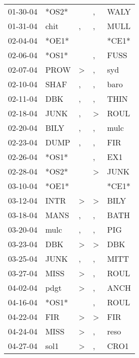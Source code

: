 \begin{supertabular}{lllll}
 01-30-04 &  *OS2* &                  &                , &   WALY \\
 01-31-04 &   chit &                , &                , &   MULL \\
 02-04-04 &  *OE1* &                  &                  &  *CE1* \\
 02-06-04 &  *OS1* &                  &                , &   FUSS \\
 02-07-04 &   PROW &     \textgreater &                , &    syd \\
 02-10-04 &   SHAF &                , &                , &   baro \\
 02-11-04 &    DBK &                , &                , &   THIN \\
 02-18-04 &   JUNK &                , &     \textgreater &   ROUL \\
 02-20-04 &   BILY &                , &                , &   mulc \\
 02-23-04 &   DUMP &                , &                , &    FIR \\
 02-26-04 &  *OS1* &                  &                , &    EX1 \\
 02-28-04 &  *OS2* &                  &     \textgreater &   JUNK \\
 03-10-04 &  *OE1* &                  &                  &  *CE1* \\
 03-12-04 &   INTR &     \textgreater &     \textgreater &   BILY \\
 03-18-04 &   MANS &                , &                , &   BATH \\
 03-20-04 &   mulc &                , &                , &    PIG \\
 03-23-04 &    DBK &     \textgreater &     \textgreater &    DBK \\
 03-25-04 &   JUNK &                , &                , &   MITT \\
 03-27-04 &   MISS &     \textgreater &                , &   ROUL \\
 04-02-04 &   pdgt &     \textgreater &                , &   ANCH \\
 04-16-04 &  *OS1* &                  &                , &   ROUL \\
 04-22-04 &    FIR &     \textgreater &     \textgreater &    FIR \\
 04-24-04 &   MISS &     \textgreater &                , &   reso \\
 04-27-04 &   sol1 &     \textgreater &                , &   CRO1 \\

\end{supertabular}
